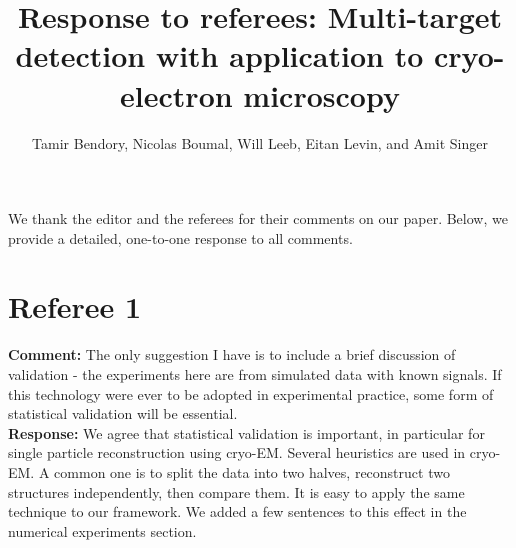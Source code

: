 \documentclass[12pt]{article}
\newcommand{\1}{\mathbf{1}}
\theoremstyle{plain}
\theoremstyle{definition}
\theoremstyle{remark}
\theoremstyle{plain}
\theoremstyle{remark}
\theoremstyle{plain}
\theoremstyle{plain}
\theoremstyle{plain}
\numberwithin{equation}{section}
\begin{document}


\title{Response to referees: Multi-target detection with application to cryo-electron microscopy}

\author{Tamir Bendory, Nicolas Boumal, Will Leeb, Eitan Levin, and Amit Singer}

\date{}
\maketitle

We thank the editor and the referees for their comments on our paper. Below, we provide a detailed, one-to-one response to all comments. 

\section{Referee 1}

\noindent \textbf{Comment:} The only suggestion I have is to include a brief discussion of validation - the experiments here are from simulated data with known signals. If this technology were ever to be adopted in experimental practice, some form of statistical validation will be essential.\\

\noindent \textbf{Response:} We agree that statistical validation is important, in particular for single particle reconstruction using cryo-EM. %
Several heuristics are used in cryo-EM. A common one is to split the data into two halves, reconstruct two structures independently, then compare them. 
It is easy to apply the same technique to our framework. We added a few sentences to this effect in the numerical experiments section.
 

 
\end{document}

